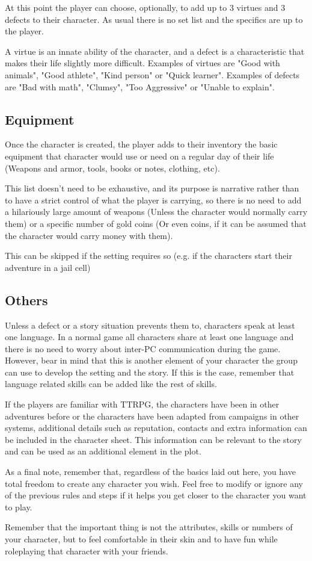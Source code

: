 At this point the player can choose, optionally, to add up to 3 virtues and 3 defects to their character. As usual there is no set list and the specifics are up to the player.

A virtue is an innate ability of the character, and a defect is a characteristic that makes their life slightly more difficult. Examples of virtues are "Good with animals", "Good athlete", "Kind person" or "Quick learner". Examples of defects are "Bad with math", "Clumsy", "Too Aggressive" or "Unable to explain".

\subsection{Equipment}

Once the character is created, the player adds to their inventory the basic equipment that character would use or need on a regular day of their life (Weapons and armor, tools, books or notes, clothing, etc). 
\par
This list doesn't need to be exhaustive, and its purpose is narrative rather than to have a strict control of what the player is carrying, so there is no need to add a hilariously large amount of weapons (Unless the character would normally carry them) or a specific number of gold coins (Or even coins, if it can be assumed that the character would carry money with them).
\par 
This can be skipped if the setting requires so (e.g. if the characters start their adventure in a jail cell)

\subsection{Others}

Unless a defect or a story situation prevents them to, characters speak at least one language. In a normal game all characters share at least one language and there is no need to worry about inter-PC communication during the game. However, bear in mind that this is another element of your character the group can use to develop the setting and the story. If this is the case, remember that language related skills can be added like the rest of skills.
\par 
If the players are familiar with TTRPG, the characters have been in other adventures before or the characters have been adapted from campaigns in other systems, additional details such as reputation, contacts and extra information can be included in the character sheet. This information can be relevant to the story and can be used as an additional element in the plot.
\par 
As a final note, remember that, regardless of the basics laid out here, you have total freedom to create any character you wish. Feel free to modify or ignore any of the previous rules and steps if it helps you get closer to the character you want to play. 
\par
Remember that the important thing is not the attributes, skills or numbers of your character, but to feel comfortable in their skin and to have fun while roleplaying that character with your friends.

